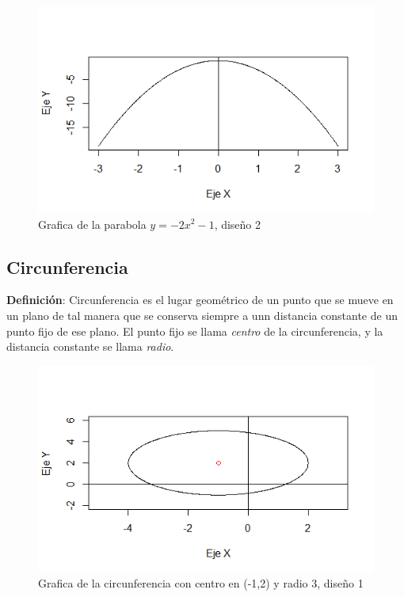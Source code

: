 \documentclass[12pt,a4paper]{article} %
\begin{document}
\begin{figure}
\centering
\includegraphics[scale=0.75]{Parabola3.png}
\caption{Grafica de la parabola $y=-2x^2-1$, diseño 2}
\end{figure}

\newpage
\subsection{Circunferencia} \label{subsec:circunferencia}

\textbf{Definici\'{o}n}: Circunferencia es el lugar geométrico de un punto que se mueve en un plano de tal manera que se conserva siempre a unn distancia constante de un punto fijo de ese plano. El punto fijo se llama \textit{centro} de la circunferencia, y la distancia constante se llama \textit{radio}.

\begin{figure}
\centering
\includegraphics[scale=0.75]{Circunfe2.png}
\caption{Grafica de la circunferencia con centro en (-1,2) y radio 3, diseño 1}
\end{figure}
\end{document}
